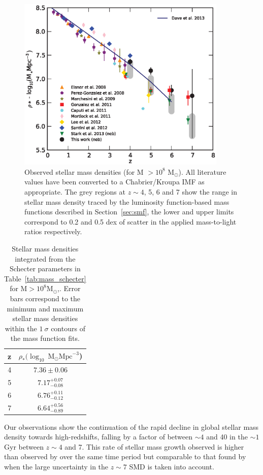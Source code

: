 \begin{figure}
\centering
\includegraphics[width=100mm]{plots/fig12.eps}
\caption{Observed stellar mass densities (for M $>10^8$ M$_{\odot}$). All literature values have been converted to a Chabrier/Kroupa IMF as appropriate. The grey regions at $z \sim 4$, 5, 6 and 7 show the range in stellar mass density traced by the luminosity function-based mass functions described in Section~\ref{sec:smf}, the lower and upper limits correspond to 0.2 and 0.5 dex of scatter in the applied mass-to-light ratios respectively.}
\label{fig:smd_evolution}
\end{figure}


\begin{table}
\centering
\label{tab:smd}
\caption{Stellar mass densities integrated from the Schecter parameters in Table~\ref{tab:mass_schecter} for $\text{M} > 10^8 \text{M}_{\odot}$,. Error bars correspond to the minimum and maximum stellar mass densities within the $1~\sigma$ contours of the mass function fits.}
\begin{tabular}{c c}
\hline
z & $\rho_{*} (\log_{10}~\text{M}_{\odot} \text{Mpc}^{-3}$)\\
\hline
4 & $7.36\pm0.06$ \\
5 & $7.17^{+0.07}_{-0.08}$ \\
6 & $6.76^{+0.11}_{-0.12}$ \\
7 & $6.64^{+0.56}_{-0.89}$ \\
\hline
\end{tabular}
\end{table}

Our observations show the continuation of the rapid decline in global stellar mass density towards high-redshifts, falling by a factor of between $\sim 4$ and 40 in the $\sim 1$ Gyr between $z \sim 4$ and 7. This rate of stellar mass growth observed is higher than observed by \citet{Gonzalez:2011dn} over the same time period but comparable to that found by \citet{Stark:2013ix} when the large uncertainty in the $z\sim7$ SMD is taken into account.

